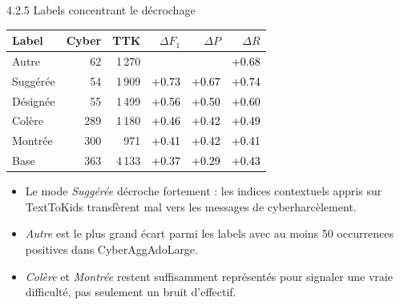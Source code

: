 \documentclass[aspectratio=169,10pt,xcolor=table]{beamer}
\begin{document}
\begin{frame}{4.2.5 Labels concentrant le d\'ecrochage}
  \small
  \begin{tabular}{@{}lrrrrr@{}}
    \toprule
    Label & Cyber & TTK & $\Delta F_1$ & $\Delta P$ & $\Delta R$ \\
    \midrule
    Autre & 62 & 1\,270 & \cellcolor[HTML]{E4602C}\textcolor{white}{+0.76} & \cellcolor[HTML]{E25727}\textcolor{white}{+0.78} & \cellcolor[HTML]{E97B39}\textcolor{black}{+0.68} \\
    Sugg\'er\'ee & 54 & 1\,909 & \cellcolor[HTML]{E5682F}\textcolor{black}{+0.73} & \cellcolor[HTML]{E97C3A}\textcolor{black}{+0.67} & \cellcolor[HTML]{E5642D}\textcolor{black}{+0.74} \\
    D\'esign\'ee & 55 & 1\,499 & \cellcolor[HTML]{EFA24F}\textcolor{black}{+0.56} & \cellcolor[HTML]{F1B55B}\textcolor{black}{+0.50} & \cellcolor[HTML]{ED9447}\textcolor{black}{+0.60} \\
    Col\`ere & 289 & 1\,180 & \cellcolor[HTML]{F0CB66}\textcolor{black}{+0.46} & \cellcolor[HTML]{EEDD6F}\textcolor{black}{+0.42} & \cellcolor[HTML]{F1BA5D}\textcolor{black}{+0.49} \\
    Montr\'ee & 300 & 971 & \cellcolor[HTML]{EEE172}\textcolor{black}{+0.41} & \cellcolor[HTML]{EEDF71}\textcolor{black}{+0.42} & \cellcolor[HTML]{EEE373}\textcolor{black}{+0.41} \\
    Base & 363 & 4\,133 & \cellcolor[HTML]{E4EC7F}\textcolor{black}{+0.37} & \cellcolor[HTML]{CBEA92}\textcolor{black}{+0.29} & \cellcolor[HTML]{EEDC6F}\textcolor{black}{+0.43} \\
    \bottomrule
  \end{tabular}

  \vspace{1.1em}
  \begin{itemize}
    \item Le mode \textit{Sugg\'er\'ee} d\'ecroche fortement : les indices contextuels appris sur TextToKids transf\`erent mal vers les messages de cyberharc\`element.
    \item \textit{Autre} est le plus grand \'ecart parmi les labels avec au moins 50 occurrences positives dans CyberAggAdoLarge.
    \item \textit{Col\`ere} et \textit{Montr\'ee} restent suffisamment repr\'esent\'es pour signaler une vraie difficult\'e, pas seulement un bruit d'effectif.
  \end{itemize}
\end{frame}
\end{document}
